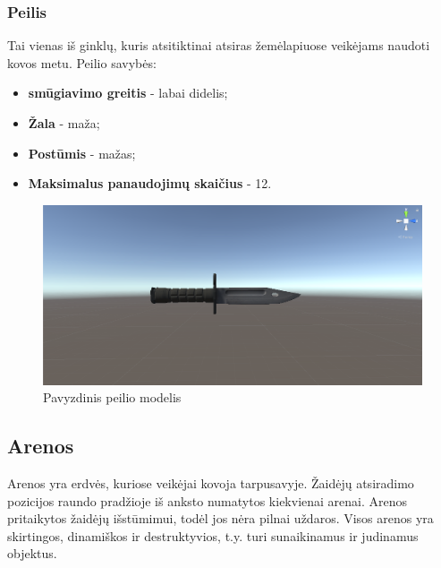 \documentclass{VUMIFPSkursinis}
\begin{document}
\subsubsection{Peilis}
Tai vienas iš ginklų, kuris atsitiktinai atsiras žemėlapiuose veikėjams naudoti kovos metu. Peilio savybės:
\begin{itemize}
    \item \textbf{smūgiavimo greitis} - labai didelis;
    \item \textbf{Žala} - maža;
    \item \textbf{Postūmis} - mažas;
    \item \textbf{Maksimalus panaudojimų skaičius} - 12.
\end{itemize}

\begin{figure}[H]
    \centering
    \includegraphics[scale=0.3]{img/Weapons/Knife.png}
    \caption{Pavyzdinis peilio modelis}
    \label{img:knife}
\end{figure}



\subsection{Arenos}
Arenos yra erdvės, kuriose veikėjai kovoja tarpusavyje. Žaidėjų atsiradimo pozicijos raundo pradžioje iš anksto numatytos kiekvienai arenai. Arenos pritaikytos žaidėjų išstūmimui, todėl jos nėra pilnai uždaros. Visos arenos yra skirtingos, dinamiškos ir destruktyvios, t.y. turi sunaikinamus ir judinamus objektus.
\end{document}
